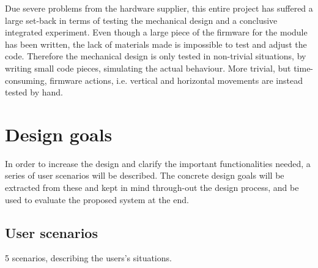 \documentclass[10pt,a4paper]{article}
\begin{document}
	Due severe problems from the hardware supplier, this entire project has suffered a large set-back in terms of testing the mechanical design and a conclusive integrated experiment. Even though a large piece of the firmware for the module has been written, the lack of materials made is impossible to test and adjust the code. Therefore the mechanical design is only tested in non-trivial situations, by writing small code pieces, simulating the actual behaviour. More trivial, but time-consuming, firmware actions, i.e. vertical and horizontal movements are instead tested by hand.
		
	\newpage
	
	\section{Design goals}
	In order to increase the design and clarify the important functionalities needed, a series of user scenarios will be described. The concrete design goals will be extracted from these and kept in mind through-out the design process, and be used to evaluate the proposed system at the end.
	
	\subsection{User scenarios}
	5 scenarios, describing the users's situations.
	
\end{document}
